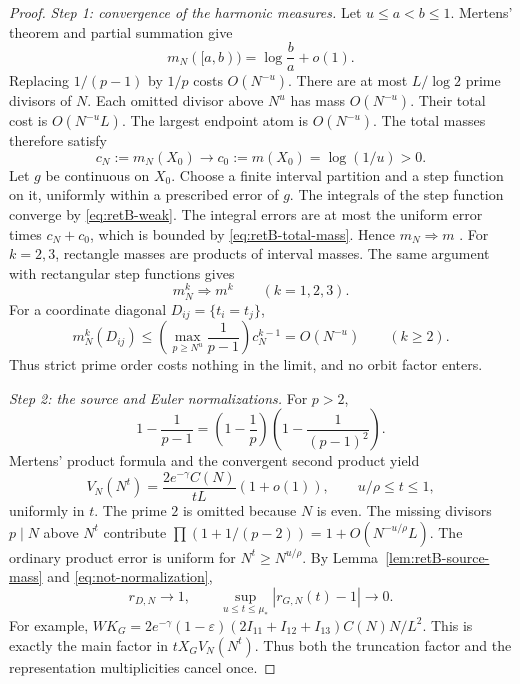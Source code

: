 \begin{proof}
\emph{Step 1: convergence of the harmonic measures.}
Let $u\le a<b\le1$.
Mertens' theorem and partial summation give
\begin{equation}\label{eq:retB-weak}
 m_N([a,b))=\log\frac ba+o(1).
\end{equation}
Replacing $1/(p-1)$ by $1/p$ costs $O(N^{-u})$.
There are at most $L/\log2$ prime divisors of $N$.
Each omitted divisor above $N^u$ has mass $O(N^{-u})$.
Their total cost is $O(N^{-u}L)$.
The largest endpoint atom is $O(N^{-u})$.
The total masses therefore satisfy
\begin{equation}\label{eq:retB-total-mass}
 c_N:=m_N(X_0)\longrightarrow c_0:=m(X_0)=\log(1/u)>0.
\end{equation}
Let $g$ be continuous on $X_0$. Choose a finite interval partition and a
step function on it, uniformly within a prescribed error of $g$.
The integrals of the step function converge by \eqref{eq:retB-weak}. The
integral errors are at most the uniform error times $c_N+c_0$, which is
bounded by \eqref{eq:retB-total-mass}. Hence $m_N\Rightarrow m$
\cite[Theorem~2.2 and Example~2.3]{Billingsley1999}.
For $k=2,3$, rectangle masses are products of interval masses. The same
argument with rectangular step functions gives
\begin{equation}\label{eq:retB-product-weak}
 m_N^k\Rightarrow m^k\qquad(k=1,2,3).
\end{equation}
For a coordinate diagonal $D_{ij}=\{t_i=t_j\}$,
\begin{equation}\label{eq:retB-diagonal-mass}
 m_N^k(D_{ij})\le
  \left(\max_{p\ge N^u}\frac1{p-1}\right)c_N^{k-1}
 =O(N^{-u})\qquad(k\ge2).
\end{equation}
Thus strict prime order costs nothing in the limit, and no orbit factor
enters.

\emph{Step 2: the source and Euler normalizations.}
For $p>2$,
\begin{equation}\label{eq:retB-Euler-factorization}
 1-\frac1{p-1}=
 \left(1-\frac1p\right)\left(1-\frac1{(p-1)^2}\right).
\end{equation}
Mertens' product formula and the convergent second product yield
\begin{equation}\label{eq:retB-Euler-limit}
 V_N(N^t)=\frac{2e^{-\gamma}C(N)}{tL}(1+o(1)),
 \qquad u/\rho\le t\le1,
\end{equation}
uniformly in $t$.
The prime $2$ is omitted because $N$ is even.
The missing divisors $p\mid N$ above $N^t$ contribute
$\prod(1+1/(p-2))=1+O(N^{-u/\rho}L)$. The ordinary product error is
uniform for $N^t\ge N^{u/\rho}$.
By Lemma~\ref{lem:retB-source-mass} and \eqref{eq:not-normalization},
\begin{equation}\label{eq:retB-density-limits}
 r_{D,N}\longrightarrow1,\qquad
 \sup_{u\le t\le\mu_*}|r_{G,N}(t)-1|\longrightarrow0.
\end{equation}
For example, $WK_G=2e^{-\gamma}(1-\varepsilon)
(2I_{11}+I_{12}+I_{13})C(N)N/L^2$.
This is exactly the main factor in $tX_GV_N(N^t)$.
Thus both the truncation factor and the representation multiplicities
cancel once.


\end{proof}
